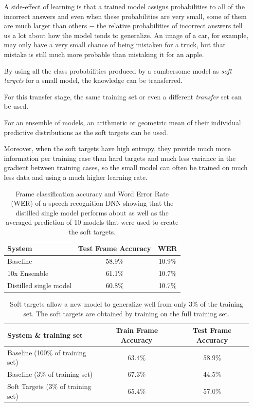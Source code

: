\documentclass[a4paper,twocolumn]{article}
\begin{document}
A side-effect of learning is that a trained model assigns probabilities to all of the incorrect answers and even when these probabilities are very small, some of them are much larger than others $-$ the relative probabilities of incorrect answers tell us a lot about how the model tends to generalize. An image of a car, for example, may only have a very small chance of being mistaken for a truck, but that mistake is still much more probable than mistaking it for an apple.

By using all the class probabilities produced by a cumbersome model as \textit{soft targets} for a small model, the knowledge can be transferred.

For this transfer stage, the same training set or even a different \textit{transfer} set can be used.

For an ensemble of models, an arithmetic or geometric mean of their individual predictive distributions as the soft targets can be used.

Moreover, when the soft targets have high entropy, they provide much more information per training case than hard targets and much less variance in the gradient between training cases, so the small model can often be trained on much less data and using a much higher learning rate.

\begin{table}[t]
    \center
    \begin{tabular}{| l | c | c |}
        \hline
        System                 & Test Frame Accuracy & WER    \\ \hline
        Baseline               & 58.9\%              & 10.9\% \\
        10x Ensemble           & 61.1\%              & 10.7\% \\
        Distilled single model & 60.8\%              & 10.7\% \\
        \hline
    \end{tabular}
    \caption{Frame classification accuracy and Word Error Rate (WER) of a speech recognition DNN showing that the distilled single model performs about as well as the averaged prediction of 10 models that were used to create the soft targets.}
\end{table}

\begin{table}[t]
    \center
    \begin{tabular}{| l | c | c |}
        \hline
        System \& training set             & Train Frame Accuracy & Test Frame Accuracy \\ \hline
        Baseline (100\% of training set)   & 63.4\%               & 58.9\%              \\
        Baseline (3\% of training set)     & 67.3\%               & 44.5\%              \\
        Soft Targets (3\% of training set) & 65.4\%               & 57.0\%              \\
        \hline
    \end{tabular}
    \caption{Soft targets allow a new model to generalize well from only 3\% of the training set. The soft targets are obtained by training on the full training set.}
\end{table}
\end{document}
